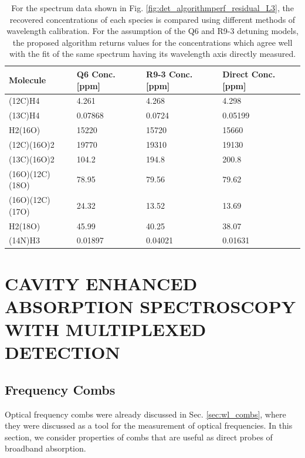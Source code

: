 \documentclass[12pt]{report}
\begin{document}
	\begin{table}[H] 
		\begin{center}
			\caption{For the spectrum data shown in Fig. \ref{fig:det_algorithmperf_residual_L3}, the recovered concentrations of each species is compared using different methods of wavelength calibration. For the assumption of the Q6 and R9-3 detuning models, the proposed algorithm returns values for the concentrations which agree well with the fit of the same spectrum having its wavelength axis directly measured.}\label{table:det_conc_table}
			\setlength{\extrarowheight}{3pt} %
			\begin{NiceTabular}{|l|l|l|l|}
				\hline
				 Molecule & Q6 Conc. [ppm] & R9-3 Conc. [ppm] & Direct Conc. [ppm] \\
				\hline
				(12C)H4 & 4.261 & 4.268 & 4.298 \\
				\hline
				(13C)H4 & 0.07868 & 0.0724 & 0.05199 \\
				\hline
				H2(16O) & 15220 & 15720 & 15660 \\
				\hline
				(12C)(16O)2 & 19770 & 19310 & 19130 \\
				\hline
				(13C)(16O)2 & 104.2 & 194.8 & 200.8 \\
				\hline
				(16O)(12C)(18O) & 78.95 & 79.56 & 79.62 \\
				\hline
				(16O)(12C)(17O) & 24.32 & 13.52 & 13.69 \\
				\hline
				H2(18O) & 45.99 & 40.25 & 38.07 \\
				\hline
				(14N)H3 & 0.01897 & 0.04021 & 0.01631 \\
				\hline
			\end{NiceTabular}
		\end{center}
	\end{table}
	
	
	
	\chapter{CAVITY ENHANCED ABSORPTION SPECTROSCOPY WITH MULTIPLEXED DETECTION} \label{chap:comb_ceas}
	
	\section{Frequency Combs}
	Optical frequency combs were already discussed in Sec. \ref{sec:wl_combs}, where they were discussed as a tool for the measurement of optical frequencies. In this section, we consider properties of combs that are useful as direct probes of broadband absorption.
	
\end{document}
